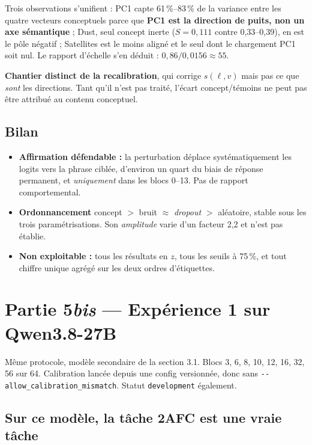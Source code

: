 \documentclass[a4paper,10pt]{article}
\newcommand{\pc}[1]{#1\,\%}
\begin{document}
Trois observations s'unifient : PC1 capte \pc{61}--\pc{83} de la variance entre les quatre vecteurs
conceptuels parce que \textbf{PC1 est la direction de puits, non un axe sémantique} ; Dust, seul
concept inerte ($S = 0{,}111$ contre 0,33--0,39), en est le pôle négatif ; Satellites est le moins
aligné et le seul dont le chargement PC1 soit nul. Le rapport d'échelle s'en déduit :
$0{,}86/0{,}0156 \approx 55$.

\textbf{Chantier distinct de la recalibration}, qui corrige $s(\ell,v)$ mais pas ce que \emph{sont}
les directions. Tant qu'il n'est pas traité, l'écart concept/témoins ne peut pas être attribué au
contenu conceptuel.

\subsection{Bilan}

\begin{itemize}
  \item \textbf{Affirmation défendable :} la perturbation déplace systématiquement les logits vers la
        phrase ciblée, d'environ un quart du biais de réponse permanent, et \emph{uniquement} dans
        les blocs 0--13. Pas de rapport comportemental.
  \item \textbf{Ordonnancement} concept $>$ bruit $\approx$ \emph{dropout} $>$ aléatoire, stable sous
        les trois paramétrisations. Son \emph{amplitude} varie d'un facteur 2,2 et n'est pas établie.
  \item \textbf{Non exploitable :} tous les résultats en $z$, tous les seuils à \pc{75}, et tout
        chiffre unique agrégé sur les deux ordres d'étiquettes.
\end{itemize}

\section{Partie 5\emph{bis} --- Expérience 1 sur Qwen3.8-27B}

Même protocole, modèle secondaire de la section 3.1. Blocs 3, 6, 8, 10, 12, 16, 32, 56 sur 64.
Calibration lancée depuis une config versionnée, donc sans \texttt{-{}-allow\_calibration\_mismatch}.
Statut \texttt{development} également.

\subsection{Sur ce modèle, la tâche 2AFC est une vraie tâche}
\end{document}
